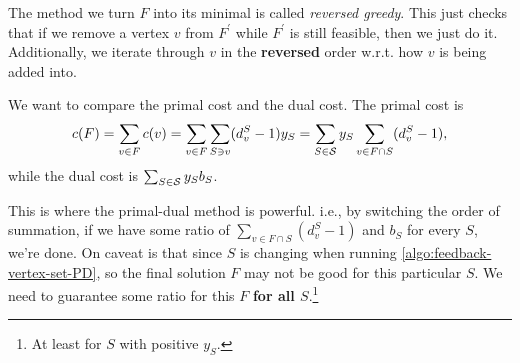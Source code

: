 \begin{remark}\label{rmk:reversed-greedy}
	The method we turn \(F\) into its minimal is called \emph{reversed greedy}. This just checks that if we remove a vertex \(v\) from \(F^\prime \) while \(F^\prime \) is still feasible, then we just do it. Additionally, we iterate through \(v\) in the \textbf{reversed} order w.r.t. how \(v\) is being added into.
\end{remark}

We want to compare the primal cost and the dual cost. The primal cost is
\[
	c(F) = \sum_{v\in F}c(v) = \sum_{v\in F}\sum_{S\ni v} (d_{v} ^S - 1) y_S = \sum_{S\in \mathcal{\MakeUppercase{S}}}y_S \sum_{v\in F \cap S}(d_{v} ^S - 1),
\]
while the dual cost is \(\sum_{S\in \mathcal{\MakeUppercase{S}} }y_S b_S\).

\begin{remark}
	This is where the primal-dual method is powerful. i.e., by switching the order of summation, if we have some ratio of \(\sum_{v\in F \cap S}(d_{v} ^S - 1)\) and \(b_S\) for every \(S\), we're done. On caveat is that since \(S\) is changing when running \autoref{algo:feedback-vertex-set-PD}, so the final solution \(F\) may not be good for this particular \(S\). We need to guarantee some ratio for this \(F\) \textbf{for all \(S\)}.\footnote{At least for \(S\) with positive \(y_S\).}
\end{remark}

